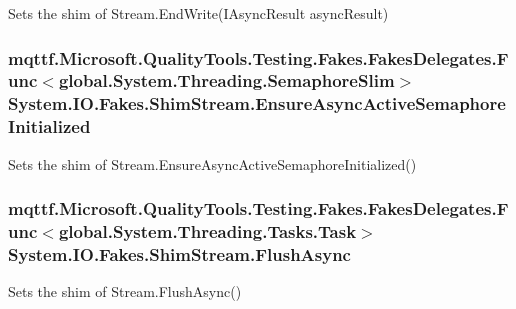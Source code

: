 Sets the shim of Stream.\-End\-Write(\-I\-Async\-Result async\-Result)

\hypertarget{class_system_1_1_i_o_1_1_fakes_1_1_shim_stream_a1af2688b810ed882fc03f3539547689a}{
\subsubsection[{Ensure\-Async\-Active\-Semaphore\-Initialized}]{\setlength{\rightskip}{0pt plus 5cm}mqttf.\-Microsoft.\-Quality\-Tools.\-Testing.\-Fakes.\-Fakes\-Delegates.\-Func$<$global.\-System.\-Threading.\-Semaphore\-Slim$>$ System.\-I\-O.\-Fakes.\-Shim\-Stream.\-Ensure\-Async\-Active\-Semaphore\-Initialized\hspace{0.3cm}{\ttfamily [set]}}}\label{class_system_1_1_i_o_1_1_fakes_1_1_shim_stream_a1af2688b810ed882fc03f3539547689a}


Sets the shim of Stream.\-Ensure\-Async\-Active\-Semaphore\-Initialized()

\hypertarget{class_system_1_1_i_o_1_1_fakes_1_1_shim_stream_a15f7a3177989baa92ad180100bf19b6e}{
\subsubsection[{Flush\-Async}]{\setlength{\rightskip}{0pt plus 5cm}mqttf.\-Microsoft.\-Quality\-Tools.\-Testing.\-Fakes.\-Fakes\-Delegates.\-Func$<$global.\-System.\-Threading.\-Tasks.\-Task$>$ System.\-I\-O.\-Fakes.\-Shim\-Stream.\-Flush\-Async\hspace{0.3cm}{\ttfamily [set]}}}\label{class_system_1_1_i_o_1_1_fakes_1_1_shim_stream_a15f7a3177989baa92ad180100bf19b6e}


Sets the shim of Stream.\-Flush\-Async()

